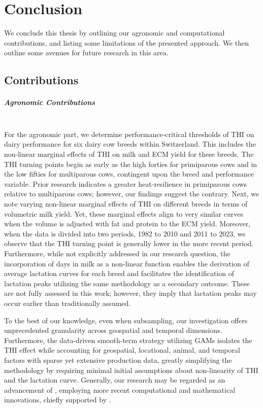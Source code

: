 \chapter{Conclusion}\label{chap:conclusion}
We conclude this thesis by outlining our agronomic and computational contributions, and listing some limitations of the presented approach. We then outline some avenues for future research in this area.

\section{Contributions}

\paragraph{Agronomic Contributions} \quad \\
For the agronomic part, we determine performance-critical thresholds of THI on dairy performance for six dairy cow breeds within Switzerland. This includes the non-linear marginal effects of THI on milk and ECM yield for these breeds. The THI turning points begin as early as the high forties for primiparous cows and in the low fifties for multiparous cows, contingent upon the breed and performance variable. Prior research indicates a greater heat-resilience in primiparous cows relative to multiparous cows; however, our findings suggest the contrary. Next, we note varying non-linear marginal effects of THI on different breeds in terms of volumetric milk yield. Yet, these marginal effects align to very similar curves when the volume is adjusted with fat and protein to the ECM yield. Moreover, when the data is divided into two periods, 1982 to 2010 and 2011 to 2023, we observe that the THI turning point is generally lower in the more recent period. Furthermore, while not explicitly addressed in our research question, the incorporation of days in milk as a non-linear function enables the derivation of average lactation curves for each breed and facilitates the identification of lactation peaks utilizing the same methodology as a secondary outcome. These are not fully assessed in this work; however, they imply that lactation peaks may occur earlier than traditionally assumed.

To the best of our knowledge, even when subsampling, our investigation offers unprecedented granularity across geospatial and temporal dimensions. Furthermore, the data-driven smooth-term strategy utilizing GAMs isolates the THI effect while accounting for geospatial, locational, animal, and temporal factors with sparse yet extensive production data, greatly simplifying the methodology by requiring minimal initial assumptions about non-linearity of THI and the lactation curve. Generally, our research may be regarded as an advancement of \cite{bryant_quantifying_2007}, employing more recent computational and mathematical innovations, chiefly supported by \cite{wood_generalized_2017}.

